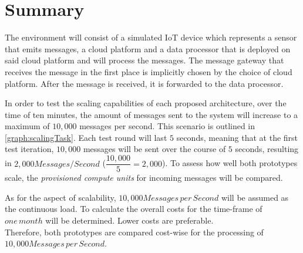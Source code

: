 \section{Summary}

The environment will consist of a simulated IoT device which represents a sensor that emits messages, a cloud platform and a data processor that is deployed on said cloud platform and will process the messages. The message gateway that receives the message in the first place is implicitly chosen by the choice of cloud platform. After the message is received, it is forwarded to the data processor.

In order to test the scaling capabilities of each proposed architecture, over the time of ten minutes, the amount of messages sent to the system will increase to a maximum of $10,000$ messages per second. This scenario is outlined in \ref{graph:scalingTask}. Each test round will last $5$ seconds, meaning that at the first test iteration, $10,000$ messages will be sent over the course of $5$ seconds, resulting in $2,000Messages/Second$ ($\dfrac{10,000}{5}=2,000$).
To assess how well both prototypes scale, the \textit{provisioned compute units} for incoming messages will be compared. 

As for the aspect of scalability, $10,000 Messages\,per\,Second$ will be assumed as the continuous load. To calculate the overall costs for the time-frame of $one\,month$ will be determined. Lower costs are preferable.\\
Therefore, both prototypes are compared cost-wise for the processing of $10,000 Messages\,per\,Second$.